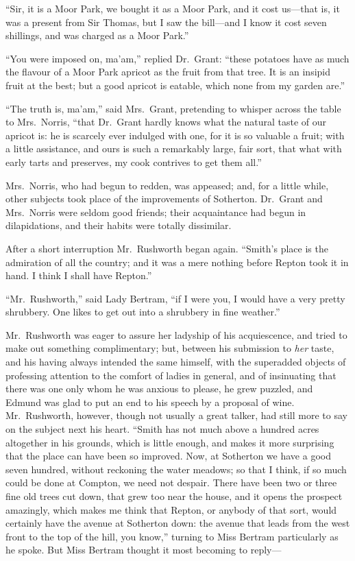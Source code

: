 \documentclass{article}
\begin{document}
``Sir, it is a Moor Park, we bought it as a Moor Park,
and it cost us---that is, it was a present from Sir Thomas,
but I saw the bill---and I know it cost seven shillings,
and was charged as a Moor Park.''

``You were imposed on, ma'am,'' replied Dr.\ Grant:
``these potatoes have as much the flavour of a Moor Park
apricot as the fruit from that tree.  It is an insipid
fruit at the best; but a good apricot is eatable,
which none from my garden are.''

``The truth is, ma'am,'' said Mrs.\ Grant, pretending to
whisper across the table to Mrs.\ Norris, ``that Dr.\ Grant
hardly knows what the natural taste of our apricot is:
he is scarcely ever indulged with one, for it is so
valuable a fruit; with a little assistance, and ours is
such a remarkably large, fair sort, that what with early
tarts and preserves, my cook contrives to get them all.''

Mrs.\ Norris, who had begun to redden, was appeased;
and, for a little while, other subjects took place of the
improvements of Sotherton.  Dr.\ Grant and Mrs.\ Norris
were seldom good friends; their acquaintance had begun
in dilapidations, and their habits were totally dissimilar.

After a short interruption Mr.\ Rushworth began again.
``Smith's place is the admiration of all the country;
and it was a mere nothing before Repton took it in hand.
I think I shall have Repton.''

``Mr.\ Rushworth,'' said Lady Bertram, ``if I were you,
I would have a very pretty shrubbery.  One likes to get
out into a shrubbery in fine weather.''

Mr.\ Rushworth was eager to assure her ladyship of his
acquiescence, and tried to make out something complimentary;
but, between his submission to \emph{her} taste, and his having
always intended the same himself, with the superadded
objects of professing attention to the comfort of ladies
in general, and of insinuating that there was one only whom
he was anxious to please, he grew puzzled, and Edmund was
glad to put an end to his speech by a proposal of wine.
Mr.\ Rushworth, however, though not usually a great talker,
had still more to say on the subject next his heart.
``Smith has not much above a hundred acres altogether
in his grounds, which is little enough, and makes it more
surprising that the place can have been so improved.
Now, at Sotherton we have a good seven hundred,
without reckoning the water meadows; so that I think,
if so much could be done at Compton, we need not despair.
There have been two or three fine old trees cut down, that grew
too near the house, and it opens the prospect amazingly,
which makes me think that Repton, or anybody of that sort,
would certainly have the avenue at Sotherton down:  the avenue
that leads from the west front to the top of the hill,
you know,'' turning to Miss Bertram particularly as he spoke.
But Miss Bertram thought it most becoming to reply---%
\end{document}
